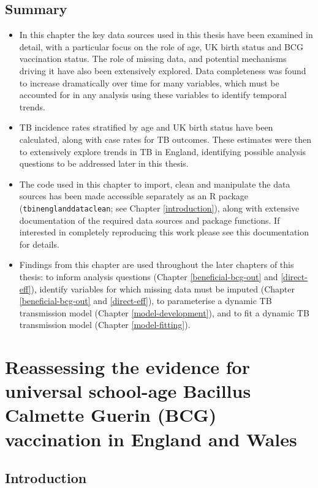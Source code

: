 \documentclass[11pt,twoside]{bristolthesis}
\begin{document}
  \hypertarget{summary-3}{%
  \section{Summary}\label{summary-3}}
  \begin{itemize}
  \item
    In this chapter the key data sources used in this thesis have been examined in detail, with a particular focus on the role of age, UK birth status and BCG vaccination status. The role of missing data, and potential mechanisms driving it have also been extensively explored. Data completeness was found to increase dramatically over time for many variables, which must be accounted for in any analysis using these variables to identify temporal trends.
  \item
    TB incidence rates stratified by age and UK birth status have been calculated, along with case rates for TB outcomes. These estimates were then to extensively explore trends in TB in England, identifying possible analysis questions to be addressed later in this thesis.
  \item
    The code used in this chapter to import, clean and manipulate the data sources has been made accessible separately as an R package (\texttt{tbinenglanddataclean}; see Chapter \ref{introduction}), along with extensive documentation of the required data sources and package functions. If interested in completely reproducing this work please see this documentation for details.
  \item
    Findings from this chapter are used throughout the later chapters of this thesis: to inform analysis questions (Chapter \ref{beneficial-bcg-out} and \ref{direct-eff}), identify variables for which missing data must be imputed (Chapter \ref{beneficial-bcg-out} and \ref{direct-eff}), to parameterise a dynamic TB transmission model (Chapter \ref{model-development}), and to fit a dynamic TB transmission model (Chapter \ref{model-fitting}).
  \end{itemize}
  \hypertarget{sutherland}{%
  \chapter{Reassessing the evidence for universal school-age Bacillus Calmette Guerin (BCG) vaccination in England and Wales}\label{sutherland}}
  
  \hypertarget{introduction-3}{%
  \section{Introduction}\label{introduction-3}}
  
\end{document}
